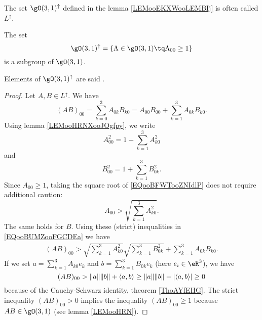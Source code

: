 The set \( \gO(3,1)^{\uparrow}\) defined in the lemma \ref{LEMooEKXWooLEMBIj} is often called \( L^{\uparrow}\).
\begin{lemma}       \label{LEMooEKXWooLEMBIj}
    The set
    \begin{equation}
        \gO(3,1)^{\uparrow}=\{ \Lambda\in\gO(3,1)\tq \Lambda_{00}\geq 1 \}
    \end{equation}
    is a subgroup of \( \gO(3,1)\).

    Elements of \( \gO(3,1)^{\uparrow}\) are said .
\end{lemma}

\begin{proof}
    Let \( A,B\in L^{\uparrow}\). We have
    \begin{equation}        \label{EQooBUMZooFGCDEa}
        (AB)_{00}=\sum_{k=0}^3A_{0k}B_{k0}=A_{00}B_{00}+\sum_{k=1}^3A_{0k}B_{k0}.
    \end{equation}
    Using lemma \ref{LEMooHRNXooJOgfpy}, we write
    \begin{equation}        \label{EQooBFWTooZNIdlP}
        A_{00}^2=1+\sum_{k=1}^3A_{k0}^2
    \end{equation}
    and
    \begin{equation}
        B_{00}^2=1+\sum_{k=1}^3B_{0k}^2.
    \end{equation}
    Since \( A_{00}\geq 1\), taking the square root of \eqref{EQooBFWTooZNIdlP} does not require additional caution:
    \begin{equation}
        A_{00}>\sqrt{ \sum_{k=1}^3A_{k0}^2 }.
    \end{equation}
    The same holds for \( B\). Using these (strict) inequalities in \eqref{EQooBUMZooFGCDEa} we have
    \begin{subequations}
        \begin{align}
            (AB)_{00}>\sqrt{ \sum_{k=1}^3A_{k0}^2 }\sqrt{ \sum_{k=1}^3B_{0k}^2 }+\sum_{k=1}^3A_{0k}B_{k0}.
        \end{align}
    \end{subequations}
    If we set \( a=\sum_{k=1}^3A_{k0}e_k\) and \( b=\sum_{k=1}^3B_{0k}e_k\) (here \( e_i\in \eR^3\)), we have
    \begin{equation}
        (AB)_{00}>\| a \|\| b \|+\langle a, b\rangle \\
        \geq \| a \|\| b \|-| \langle a, b\rangle  |\\
        \geq 0
    \end{equation}
    because of the Cauchy-Schwarz identity, theorem \ref{ThoAYfEHG}. The strict inequality \( (AB)_{00}>0\) implies the inequality \( (AB)_{00}\geq 1\) because \( AB\in \gO(3,1)\) (see lemma \ref{LEMooHRN}).
\end{proof}

